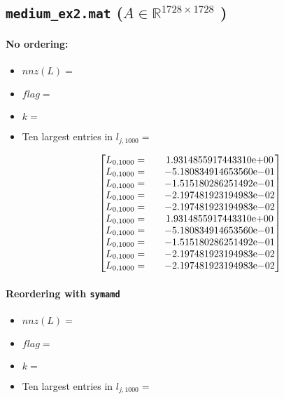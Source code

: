 \begin{enumerate}
\subsection*{\texttt{medium\_ex2.mat} ($A\in \mathbb{R}^{1728\times 1728}$ )}
\paragraph*{No ordering:}
\begin{itemize}
\item $nnz(L)= $
\item $flag= $
\item $k= $
\item Ten largest entries in $l_{j,1000}= $

$$
\begin{bmatrix}
L_{0,1000}=  & \quad {1.9314855917443310}\mathrm{e}{+00}\\
L_{0,1000}=  & \quad {-5.180834914653560}\mathrm{e}{-01}\\
L_{0,1000}=  & \quad {-1.515180286251492}\mathrm{e}{-01}\\
L_{0,1000}=  & \quad {-2.197481923194983}\mathrm{e}{-02}\\
L_{0,1000}=  & \quad {-2.197481923194983}\mathrm{e}{-02}\\
L_{0,1000}=  & \quad {1.9314855917443310}\mathrm{e}{+00}\\
L_{0,1000}=  & \quad {-5.180834914653560}\mathrm{e}{-01}\\
L_{0,1000}=  & \quad {-1.515180286251492}\mathrm{e}{-01}\\
L_{0,1000}=  & \quad {-2.197481923194983}\mathrm{e}{-02}\\
L_{0,1000}=  & \quad {-2.197481923194983}\mathrm{e}{-02}\\
\end{bmatrix}
$$
\end{itemize}
\paragraph*{Reordering with \texttt{symamd}}
\begin{itemize}
\item $nnz(L)= $
\item $flag= $
\item $k= $
\item Ten largest entries in $l_{j,1000}= $


\end{itemize}
\end{enumerate}
